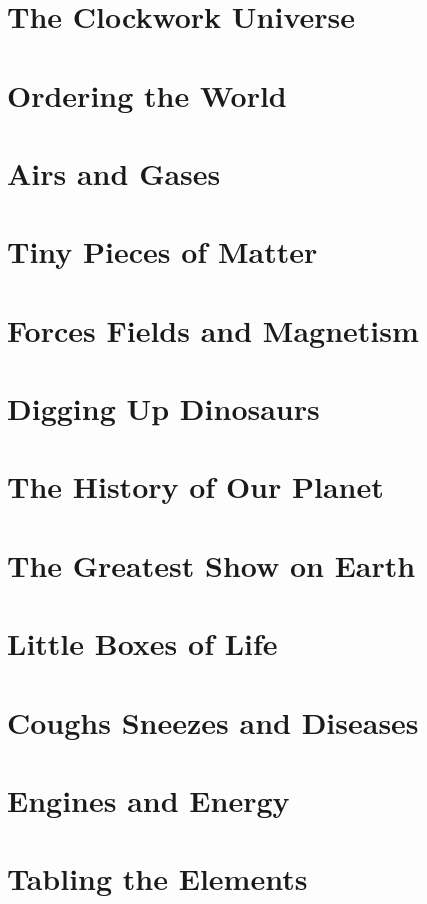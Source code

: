 \documentclass[a4paper,11pt]{article}
\begin{document}
\section{The Clockwork Universe}

\section{Ordering the World}

\section{Airs and Gases}

\section{Tiny Pieces of Matter}

\section{Forces Fields and Magnetism}

\section{Digging Up Dinosaurs}

\section{The History of Our Planet}

\section{The Greatest Show on Earth}

\section{Little Boxes of Life}

\section{Coughs Sneezes and Diseases}

\section{Engines and Energy}

\section{Tabling the Elements}
\end{document}
